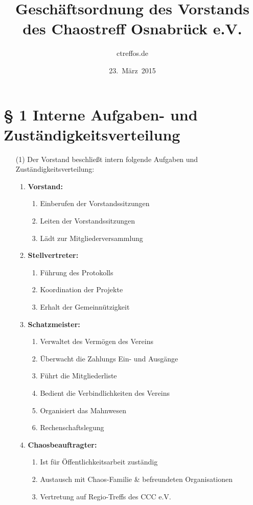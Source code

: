 \documentclass[a4paper,12pt]{scrartcl}
\title{Geschäftsordnung des Vorstands des Chaostreff Osnabrück e.V.}
\author{ctreffos.de}
\date{23.~März~2015}
\begin{document}
\maketitle

\section*{\S{} 1 Interne Aufgaben- und Zuständigkeitsverteilung}
\begin{enumerate}
\item[(1)]
Der Vorstand beschließt intern folgende Aufgaben und Zuständigkeitsverteilung:

\begin{enumerate}
\item \textbf{Vorstand:}
\begin{enumerate}
\item Einberufen der Vorstandssitzungen
\item Leiten der Vorstandssitzungen
\item Lädt zur Mitgliederversammlung
\end{enumerate}

\item \textbf{Stellvertreter:}
\begin{enumerate}
\item Führung des Protokolls
\item Koordination der Projekte
\item Erhalt der Gemeinnützigkeit
\end{enumerate}

\item \textbf{Schatzmeister:}
\begin{enumerate}
\item Verwaltet des Vermögen des Vereins
\item Überwacht die Zahlungs Ein- und Ausgänge
\item Führt die Mitgliederliste
\item Bedient die Verbindlichkeiten des Vereins
\item Organisiert das Mahnwesen
\item Rechenschaftslegung
\end{enumerate}

\item \textbf{Chaosbeauftragter:}
\begin{enumerate}
\item Ist für Öffentlichkeitsarbeit zuständig
\item Austausch mit Chaos-Familie \& befreundeten Organisationen
\item Vertretung auf Regio-Treffs des CCC e.V.
\end{enumerate}


\end{enumerate}
\end{enumerate}
\end{document}
